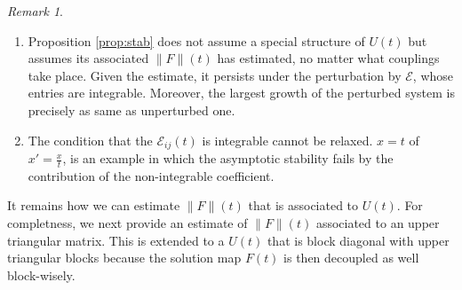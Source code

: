 \documentclass[a4paper,11pt]{article}
\theoremstyle{remark}
\newtheorem{remark}{Remark}[section]
\begin{document}
\begin{remark}
 \begin{enumerate}
  \item Proposition \ref{prop:stab} does not assume a special structure of $U(t)$ but assumes its associated $\|F\|(t)$ has estimated, no matter what couplings take place. Given the estimate, it persists under the perturbation by $\mathcal{E}$, whose entries are integrable. Moreover, the largest growth of the perturbed system is precisely as same as unperturbed one.
  \item The condition that the $\mathcal{E}_{ij}(t)$ is integrable cannot be relaxed. $x=t$ of  $x'=\frac{x}{t}$, is an example in which the asymptotic stability fails by the contribution of the non-integrable coefficient.
 \end{enumerate}
\end{remark}

It remains how we can estimate $\|F\|(t)$ that is associated to $U(t)$. For completness, we next provide an estimate of $\|F\|(t)$ associated to an upper triangular matrix. This is extended to a $U(t)$ that is block diagonal with upper triangular blocks because the solution map $F(t)$ is then decoupled as well block-wisely. 
\end{document}
